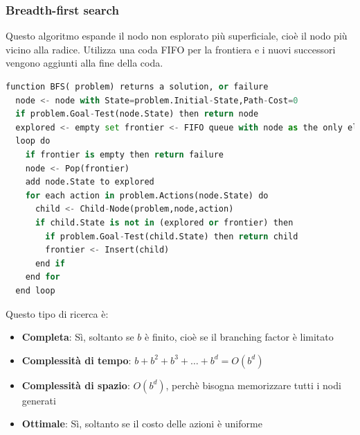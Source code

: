 \documentclass[a4paper]{article}
\begin{document}
\subsubsection{Breadth-first search}
Questo algoritmo espande il nodo non esplorato più superficiale, cioè il nodo più vicino
alla radice. Utilizza una coda FIFO per la frontiera e i nuovi successori vengono
aggiunti alla fine della coda.
\begin{lstlisting}[language=Python]
function BFS( problem) returns a solution, or failure
  node <- node with State=problem.Initial-State,Path-Cost=0
  if problem.Goal-Test(node.State) then return node
  explored <- empty set frontier <- FIFO queue with node as the only element
  loop do
    if frontier is empty then return failure
    node <- Pop(frontier)
    add node.State to explored
    for each action in problem.Actions(node.State) do
      child <- Child-Node(problem,node,action)
      if child.State is not in (explored or frontier) then
        if problem.Goal-Test(child.State) then return child
        frontier <- Insert(child)
      end if
    end for
  end loop
\end{lstlisting}
\noindent
Questo tipo di ricerca è:
\begin{itemize}
  \item \textbf{Completa}: Sì, soltanto se \( b \) è finito, cioè se il branching factor
    è limitato
  \item \textbf{Complessità di tempo}: \( b + b^2 + b^3 + \ldots + b^d = O(b^d) \)
  \item \textbf{Complessità di spazio}: \( O(b^d) \), perchè bisogna memorizzare tutti i nodi
    generati
  \item \textbf{Ottimale}: Sì, soltanto se il costo delle azioni è uniforme
\end{itemize}
\end{document}
